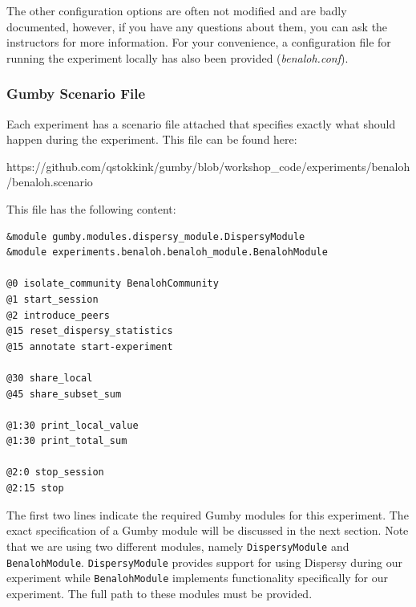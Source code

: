 \documentclass{article}
\begin{document}
The other configuration options are often not modified and are badly documented, however, if you have any questions about them, you can ask the instructors for more information.
For your convenience, a configuration file for running the experiment locally has also been provided (\emph{benaloh.conf}).

\subsubsection{Gumby Scenario File}
\label{sec:gumby_scenario}
Each experiment has a scenario file attached that specifies exactly what should happen during the experiment.
This file can be found here:

https://github.com/qstokkink/gumby/blob/workshop\_code/experiments/benaloh/benaloh.scenario

This file has the following content:

\begin{lstlisting}[frame=single]
&module gumby.modules.dispersy_module.DispersyModule
&module experiments.benaloh.benaloh_module.BenalohModule

@0 isolate_community BenalohCommunity
@1 start_session
@2 introduce_peers
@15 reset_dispersy_statistics
@15 annotate start-experiment

@30 share_local
@45 share_subset_sum

@1:30 print_local_value
@1:30 print_total_sum

@2:0 stop_session
@2:15 stop
\end{lstlisting}

The first two lines indicate the required Gumby modules for this experiment.
The exact specification of a Gumby module will be discussed in the next section.
Note that we are using two different modules, namely \texttt{DispersyModule} and \texttt{BenalohModule}.
\texttt{DispersyModule} provides support for using Dispersy during our experiment while \texttt{BenalohModule} implements functionality specifically for our experiment.
The full path to these modules must be provided.
\end{document}
